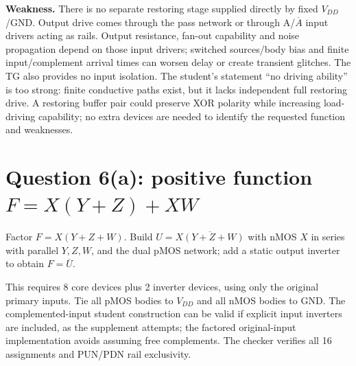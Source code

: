 \documentclass[10pt]{article}
\newcommand{\mos}[4]{\begin{scope}[shift={(#1,#2)}]
\draw(0,.24)--(0,-.24);\draw(0,.2)--(.25,.2)--(.25,.5);\draw(0,-.2)--(.25,-.2)--(.25,-.5);
\draw(-.16,.23)--(-.16,-.23);
\ifnum#4=1\draw(-.26,0)circle(.06);\draw(-.75,0)--(-.32,0);\else\draw(-.75,0)--(-.16,0);\fi
\node[anchor=east,font=\scriptsize]at(-.76,0){$#3$};\end{scope}}
\newcommand{\gnd}[2]{\draw(#1,#2)--(#1,{#2-.12});\draw({#1-.17},{#2-.12})--({#1+.17},{#2-.12});\draw({#1-.11},{#2-.2})--({#1+.11},{#2-.2});}
\newcommand{\rail}[3]{\draw(#1,#2)--(#1,{#2+.14});\node[above,font=\scriptsize]at(#1,{#2+.14}){$#3$};}
\begin{document}
\textbf{Weakness.} There is no separate restoring stage supplied directly by fixed $V_{DD}$/GND. Output drive comes through the pass network or through A/$\overline A$ input drivers acting as rails. Output resistance, fan-out capability and noise propagation depend on those input drivers; switched sources/body bias and finite input/complement arrival times can worsen delay or create transient glitches. The TG also provides no input isolation. The student's statement ``no driving ability'' is too strong: finite conductive paths exist, but it lacks independent full restoring drive. A restoring buffer pair could preserve XOR polarity while increasing load-driving capability; no extra devices are needed to identify the requested function and weaknesses.

\newpage\section*{Question 6(a): positive function $F=X(Y+Z)+XW$}
Factor $F=X(Y+Z+W)$. Build $U=\overline{X(Y+Z+W)}$ with nMOS $X$ in series with parallel $Y,Z,W$, and the dual pMOS network; add a static output inverter to obtain $F=\overline U$.
\begin{center}\end{center}
This requires 8 core devices plus 2 inverter devices, using only the original primary inputs. Tie all pMOS bodies to $V_{DD}$ and all nMOS bodies to GND. The complemented-input student construction can be valid if explicit input inverters are included, as the supplement attempts; the factored original-input implementation avoids assuming free complements. The checker verifies all 16 assignments and PUN/PDN rail exclusivity.
\end{document}
